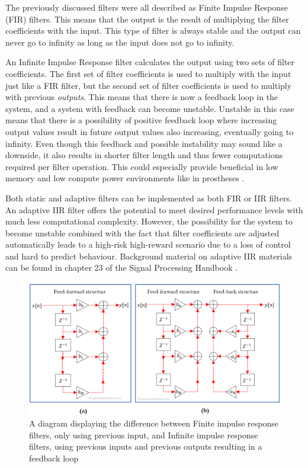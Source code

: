 The previously discussed filters were all described as Finite Impulse Response (FIR) filters. This means that the output is the result of multiplying the filter coefficients with the input. This type of filter is always stable and the output can never go to infinity as long as the input does not go to infinity.

An Infinite Impulse Response filter calculates the output using two sets of filter coefficients. The first set of filter coefficients is used to multiply with the input just like a FIR filter, but the second set of filter coefficients is used to multiply with previous \textit{outputs}. This means that there is now a feedback loop in the system, and a system with feedback can become unstable. Unstable in this case means that there is a possibility of positive feedback loop where increasing output values result in future output values also increasing, eventually going to infinity. Even though this feedback and possible instability may sound like a downside, it also results in shorter filter length and thus fewer computations required per filter operation. This could especially provide beneficial in low memory and low compute power environments like in prostheses \cite{fir_vs_iir}.

Both static and adaptive filters can be implemented as both FIR or IIR filters. An adaptive IIR filter offers the potential to meet desired performance levels with much less computational complexity. However, the possibility for the system to become unstable combined with the fact that filter coefficients are adjusted automatically leads to a high-risk high-reward scenario due to a loss of control and hard to predict behaviour. Background material on adaptive IIR materials can be found in chapter 23 of the Signal Processing Handbook \cite{digital_signal_processing_handbook}.

\begin{figure}[h!t]
	\begin{center}
		\includegraphics[width=1.0\columnwidth]{images/fir_vs_iir_diagram.png}
	\end{center}
	\caption{A diagram displaying the difference between Finite impulse response filters, only using previous input, and Infinite impulse response filters, using previous inputs and previous outputs resulting in a feedback loop \cite{fir_vs_iir_diagram}}
	\label{fig:fir_vs_iir_diagram}
\end{figure}


